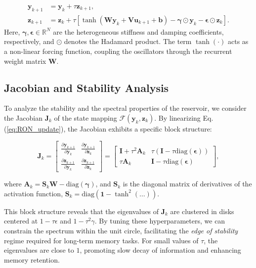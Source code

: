 \begin{equation} \label{eq:RON_update}
\begin{aligned}
    \mathbf{y}_{k+1} &= \mathbf{y}_k + \tau \mathbf{z}_{k+1}, \\
    \mathbf{z}_{k+1} &= \mathbf{z}_k + \tau \left[ \tanh(\mathbf{W}\mathbf{y}_k + \mathbf{V}\mathbf{u}_{k+1} + \mathbf{b}) - \bm{\gamma} \odot \mathbf{y}_k - \bm{\epsilon} \odot \mathbf{z}_k \right].
\end{aligned}
\end{equation}
Here, $\bm{\gamma}, \bm{\epsilon} \in \mathbb{R}^N$ are the heterogeneous stiffness and damping coefficients, respectively, and $\odot$ denotes the Hadamard product. The term $\tanh(\cdot)$ acts as a non-linear forcing function, coupling the oscillators through the recurrent weight matrix $\mathbf{W}$.

\subsection*{Jacobian and Stability Analysis}
To analyze the stability and the spectral properties of the reservoir, we consider the Jacobian $\mathbf{J}_k$ of the state mapping $\mathcal{F}(\mathbf{y}_k, \mathbf{z}_k)$. By linearizing Eq. (\ref{eq:RON_update}), the Jacobian exhibits a specific block structure:

\begin{equation} \label{eq:RON_Jacobian}
\mathbf{J}_k = 
\begin{bmatrix}
    \frac{\partial \mathbf{y}_{k+1}}{\partial \mathbf{y}_k} & \frac{\partial \mathbf{y}_{k+1}}{\partial \mathbf{z}_k} \\[6pt]
    \frac{\partial \mathbf{z}_{k+1}}{\partial \mathbf{y}_k} & \frac{\partial \mathbf{z}_{k+1}}{\partial \mathbf{z}_k}
\end{bmatrix}
=
\begin{bmatrix}
    \mathbf{I} + \tau^2 \mathbf{A}_k & \tau(\mathbf{I} - \tau \text{diag}(\bm{\epsilon})) \\[6pt]
    \tau \mathbf{A}_k & \mathbf{I} - \tau \text{diag}(\bm{\epsilon})
\end{bmatrix},
\end{equation}

where $\mathbf{A}_k = \mathbf{S}_k \mathbf{W} - \text{diag}(\bm{\gamma})$, and $\mathbf{S}_k$
 is the diagonal matrix of derivatives of the activation function, 
 $\mathbf{S}_k = \text{diag}(\mathbf{1} - \tanh^2(\dots))$.

This block structure reveals that the eigenvalues of $\mathbf{J}_k$ are clustered in disks centered
 at $1 - \tau \epsilon$ and $1 - \tau^2 \gamma$.\newline
  By tuning these hyperparameters, we can constrain the spectrum within
  the unit circle, facilitating the \textit{edge of stability} regime required for long-term memory tasks.
  For small values of $\tau$, the eigenvalues are close to $1$, promoting slow decay of information and enhancing memory retention.

